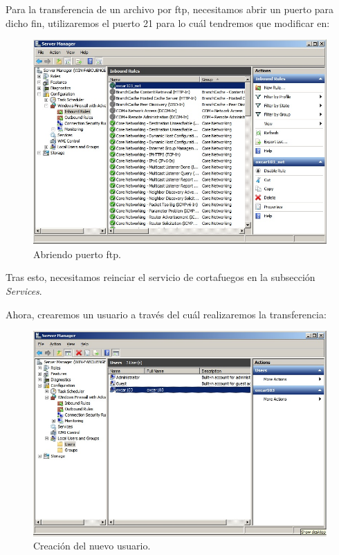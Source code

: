 \documentclass[paper=a4, fontsize=11pt]{scrartcl} %
\numberwithin{equation}{section} %
\numberwithin{figure}{section} %
\numberwithin{table}{section} %
\begin{document}
\begin{enumerate}
		Para la transferencia de un archivo por ftp, necesitamos abrir un puerto para dicho fin,
		utilizaremos el puerto 21 para lo cuál tendremos que modificar en:
		
		\begin{figure}[H]
			\centering
			\includegraphics[width=15cm]{Ejercicio_15b.jpg}
			\caption{Abriendo puerto ftp.}
			\label{fig:ftp}
		\end{figure}
		
		Tras esto, necesitamos reinciar el servicio de cortafuegos en la subsección \textit{Services}.
		
		Ahora, crearemos un usuario a través del cuál realizaremos la transferencia:
		
		\begin{figure}[H]
			\centering
			\includegraphics[width=15cm]{Ejercicio_15c.jpg}
			\caption{Creación del nuevo usuario.}
			\label{fig:user}
		\end{figure}
		

\end{enumerate}
\end{document}
